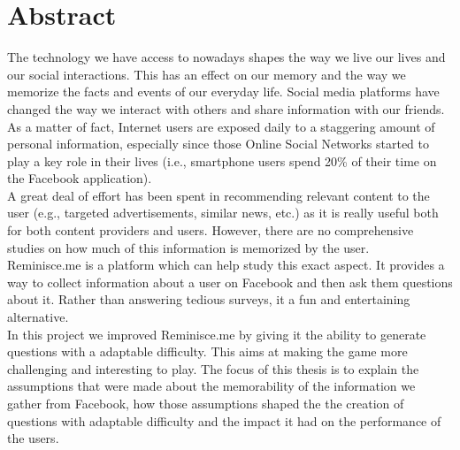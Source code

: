 

\cleardoublepage
\chapter*{Abstract}
The technology we have access to nowadays shapes the way we live our lives and our social interactions. This has an effect on our memory and the way we memorize the facts and events of our everyday life. Social media platforms have changed the way we interact with others and share information with our friends. As a matter of fact, Internet users are exposed daily to a staggering amount of personal information, especially since those Online Social Networks started to play a key role in their lives (i.e., smartphone users spend 20\% of their time on the Facebook application).\\
A great deal of effort has been spent in recommending relevant content to the user (e.g., targeted advertisements, similar news, etc.) as it is really useful both for both content providers and users. However, there are no comprehensive studies on how much of this information is memorized by the user.\\
Reminisce.me is a platform which can help study this exact aspect. It provides a way to collect information about a user on Facebook and then ask them questions about it. Rather than answering tedious surveys, it  a fun and entertaining alternative.\\
In this project we improved Reminisce.me by giving it the ability to generate questions with a adaptable difficulty. This aims at making the game more challenging and interesting to play. The focus of this thesis is to explain the assumptions that were made about the memorability of the information we gather from Facebook, how those assumptions shaped the the creation of questions with adaptable difficulty and the impact it had on the performance of the users.
